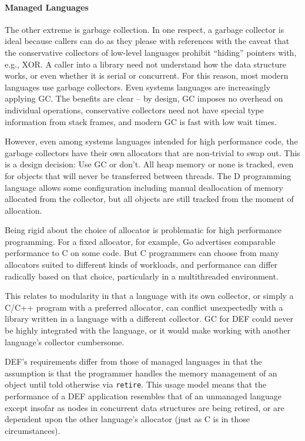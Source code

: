 \paragraph{Managed Languages} The other extreme is garbage collection.  In one respect, a garbage collector is ideal because callers can do as they please with references with the caveat that the conservative collectors of low-level languages prohibit ``hiding'' pointers with, e.g., XOR.  A caller into a library need not understand how the data structure works, or even whether it is serial or concurrent.  For this reason, most modern languages use garbage collectors.  Even systems languages are increasingly applying GC.\cite{D, Go, Nim}  The benefits are clear -- by design, GC imposes no overhead on individual operations, conservative collectors need not have special type information from stack frames, and modern GC is fast with low wait times.\cite{ShahriyarBM14}

However, even among systems languages intended for high performance code, the garbage collectors have their own allocators that are non-trivial to swap out.\cite{Go, DotNetGC, D}  This is a design decision: Use GC or don't.  All heap memory or none is tracked, even for objects that will never be transferred between threads.  The D programming language allows some configuration including manual deallocation of memory allocated from the collector, but all objects are still tracked from the moment of allocation.\cite{DPhobos}

Being rigid about the choice of allocator is problematic for high performance programming.  For a fixed allocator, for example, Go advertises comparable performance to C on some code.  But C programmers can choose from many allocators suited to different kinds of workloads, and performance can differ radically based on that choice, particularly in a multithreaded environment.\cite{Hoard, Michael2004, TCMalloc, JEMalloc, Supermalloc}

This relates to modularity in that a language with its own collector, or simply a C/C++ program with a preferred allocator, can conflict unexpectedly with a library written in a language with a different collector.  GC for DEF could never be highly integrated with the language, or it would make working with another language's collector cumbersome.

DEF's requirements differ from those of managed languages in that the assumption is that the programmer handles the memory management of an object until told otherwise via \texttt{retire}.  This usage model means that the performance of a DEF application resembles that of an unmanaged language except insofar as nodes in concurrent data structures are being retired, or are dependent upon the other language's allocator (just as C is in those circumstances).


